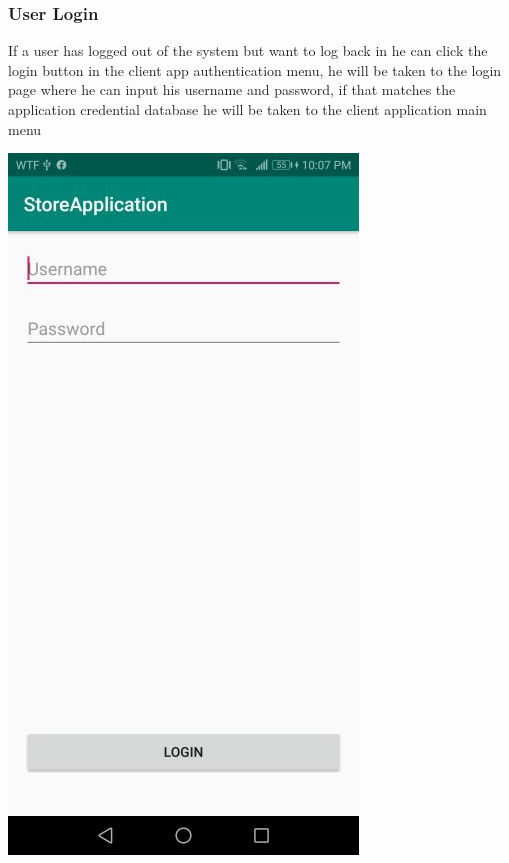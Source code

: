 \documentclass[12pt]{article}
\begin{document}
\subsubsection{User Login}
\hspace{0.6cm}
If a user has logged out of the system but want to log back in he can click the login button in the client app
authentication menu, he will be taken to the login page where he can input his username and password, if that
matches the application credential database he will be taken to the client application main menu

\begin{center}
\includegraphics[width=0.3\linewidth]{Images/Client/ClientLogin.jpg}
\end{center}
\end{document}

